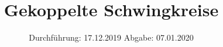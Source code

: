 

\subject{Versuch Nr. 355}
\title{Gekoppelte Schwingkreise}
\date{%
  Durchführung: 17.12.2019
  \hspace{3em}
  Abgabe: 07.01.2020
}


\setlength{\parindent}{0pt} %

\maketitle
\thispagestyle{empty}
\tableofcontents
\newpage



%




\nocite{demtröder2}
\nocite{Versuchsanleitung}
\printbibliography{}


